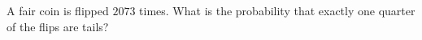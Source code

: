A fair coin is flipped $2073$ times. What is the probability that exactly one quarter of the flips are tails?
